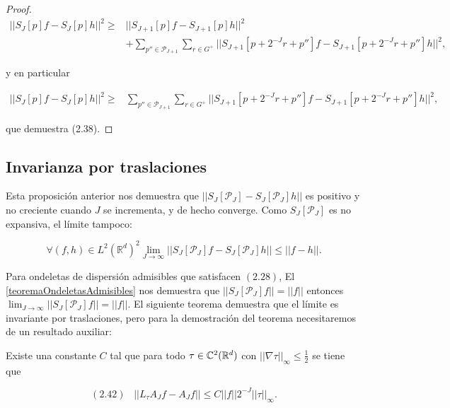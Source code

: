 \begin{proof}
\begin{align*}
    ||S_{J}[p]f - S_J[p]h||^2 \geq & ||S_{J+1}[p]f-S_{J+1}[p]h||^2 \\
    & + \sum_{p''\in \mathcal{P}_{J+1}} \sum_{r\in G^+} || S_{J+1}[p+2^{-J}r+p'']f- S_{J+1}[p+2^{-J}r+p'']h||^2,
\end{align*}

\noindent y en particular

\begin{align*}
  ||S_{J}[p]f - S_J[p]h||^2 \geq & \sum_{p''\in \mathcal{P}_{J+1}} \sum_{r\in G^+} || S_{J+1}[p+2^{-J}r+p'']f- S_{J+1}[p+2^{-J}r+p'']h||^2,
\end{align*}

\noindent que demuestra (2.38). \qedhere
\end{proof}


\subsection{Invarianza por traslaciones}

\noindent Esta proposición anterior nos demuestra que $||S_J[\mathcal{P}_J]-S_J[\mathcal{P}_J]h||$ es positivo y no creciente cuando $J$ se incrementa, y de hecho converge. Como $S_J[\mathcal{P}_J]$ es no expansiva, el límite tampoco: 

$$\forall (f,h)\in L^2(\mathbb{R}^d)^2 \lim_{J\rightarrow\infty} ||S_J[\mathcal{P}_J]f-S_{J}[\mathcal{P}_J]h|| \leq ||f-h||.$$

\medskip

\noindent Para ondeletas de dispersión admisibles que satisfacen $(2.28)$, El \autoref{teoremaOndeletasAdmisibles} nos demuestra que $||S_J[\mathcal{P}_J]f||=||f||$ entonces $\lim_{J\rightarrow\infty}||S_J[\mathcal{P}_J]f||=||f||$. El siguiente teorema demuestra que el límite es invariante por traslaciones, pero para la demostración del teorema necesitaremos de un resultado auxiliar: 

\begin{lema} \label{lema::constante}
  Existe una constante $C$ tal que para todo $\tau \in \mathbb{C}^2(\mathbb{R}^d)$ con $||\nabla \tau ||_\infty \leq \frac{1}{2}$ se tiene que 
  
  $$(2.42) \;\;\; ||L_\tau A_J f - A_J f|| \leq C ||f||2^{-J}||\tau||_{\infty}.$$
\end{lema}

